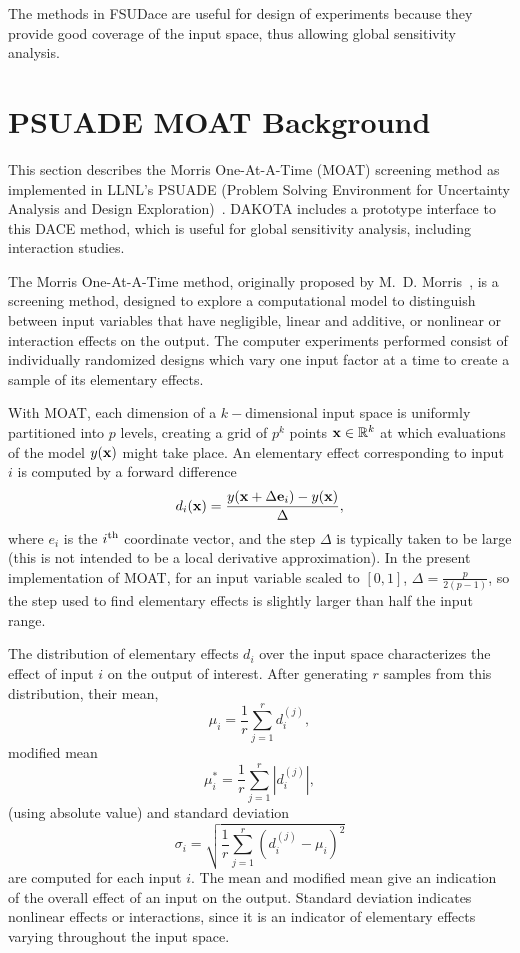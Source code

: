 The methods in FSUDace are useful for design of experiments because 
they provide good coverage of the input space, thus allowing global 
sensitivity analysis.  

\section{PSUADE MOAT Background}\label{dace:psuade}

This section describes the Morris One-At-A-Time (MOAT) screening
method as implemented in LLNL's PSUADE (Problem Solving Environment
for Uncertainty Analysis and Design Exploration)~\cite{Ton05}.  DAKOTA
includes a prototype interface to this DACE method, which is useful
for global sensitivity analysis, including interaction studies. 

The Morris One-At-A-Time method, originally proposed by
M.~D. Morris~\cite{Mor91}, is a screening method, designed to explore
a computational model to distinguish between input variables that have
negligible, linear and additive, or nonlinear or interaction effects
on the output.  The computer experiments performed consist of
individually randomized designs which vary one input factor at a time
to create a sample of its elementary effects.

With MOAT, each dimension of a $k-$dimensional input space is
uniformly partitioned into $p$ levels, creating a grid of $p^k$ points
${\bf x} \in \mathbb{R}^k$ at which evaluations of the model $y({\bf
x})$ might take place.  An elementary effect corresponding to input
$i$ is computed by a forward difference
\begin{equation}
d_i({\bf x}) = \frac{y({\bf x} + \Delta {\bf e}_i) - y({\bf x})}{\Delta},
\end{equation}
where $e_i$ is the $i^{\mbox{\scriptsize th}}$ coordinate vector, and
the step $\Delta$ is typically taken to be large (this is not intended
to be a local derivative approximation).  In the present
implementation of MOAT, for an input variable scaled to $[0,1]$,
$\Delta = \frac{p}{2(p-1)}$, so the step used to find elementary
effects is slightly larger than half the input range.

The distribution of elementary effects $d_i$ over the input space
characterizes the effect of input $i$ on the output of interest.
After generating $r$ samples from this distribution, their mean,
\begin{equation}
\mu_i = \frac{1}{r}\sum_{j=1}^{r}{d_i^{(j)}},
\end{equation}
modified mean
\begin{equation}
\mu_i^* = \frac{1}{r}\sum_{j=1}^{r}{|d_i^{(j)}|},
\end{equation}
(using absolute value) and standard deviation
\begin{equation}
\sigma_i = \sqrt{ \frac{1}{r}\sum_{j=1}^{r}{ \left(d_i^{(j)} - \mu_i
\right)^2} }
\end{equation}
are computed for each input $i$.  The mean and modified mean give an
indication of the overall effect of an input on the output.  Standard
deviation indicates nonlinear effects or interactions, since it is an
indicator of elementary effects varying throughout the input space.

